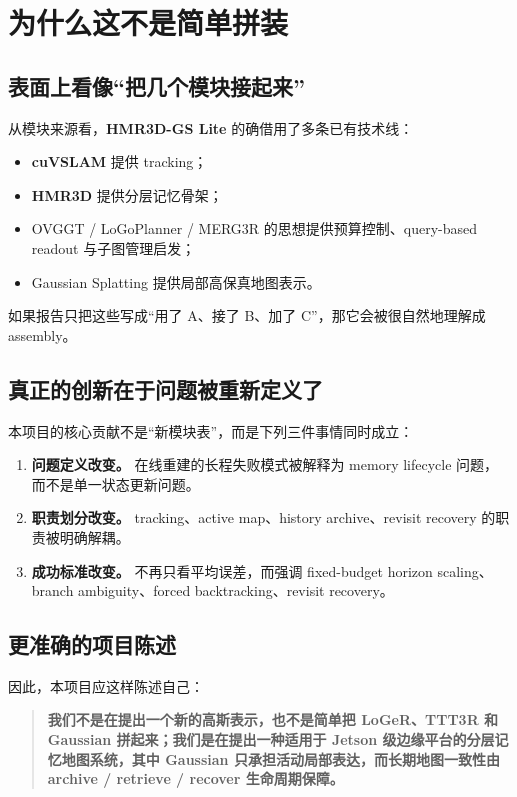 \documentclass[12pt]{article}
\newcommand{\system}{\textbf{HMR3D-GS Lite}}
\newcommand{\hmr}{\textbf{HMR3D}}
\newcommand{\cuvslam}{\textbf{cuVSLAM}}
\begin{document}
\section{为什么这不是简单拼装}

\subsection{表面上看像“把几个模块接起来”}

从模块来源看，\system{} 的确借用了多条已有技术线：
\begin{itemize}
  \item \cuvslam{} 提供 tracking；
  \item \hmr{} 提供分层记忆骨架；
  \item OVGGT / LoGoPlanner / MERG3R 的思想提供预算控制、query-based readout 与子图管理启发；
  \item Gaussian Splatting 提供局部高保真地图表示。
\end{itemize}

如果报告只把这些写成“用了 A、接了 B、加了 C”，那它会被很自然地理解成 assembly。

\subsection{真正的创新在于问题被重新定义了}

本项目的核心贡献不是“新模块表”，而是下列三件事情同时成立：
\begin{enumerate}
  \item \textbf{问题定义改变。} 在线重建的长程失败模式被解释为 memory lifecycle 问题，而不是单一状态更新问题。
  \item \textbf{职责划分改变。} tracking、active map、history archive、revisit recovery 的职责被明确解耦。
  \item \textbf{成功标准改变。} 不再只看平均误差，而强调 fixed-budget horizon scaling、branch ambiguity、forced backtracking、revisit recovery。
\end{enumerate}

\subsection{更准确的项目陈述}

因此，本项目应这样陈述自己：
\begin{quote}
\textbf{我们不是在提出一个新的高斯表示，也不是简单把 LoGeR、TTT3R 和 Gaussian 拼起来；我们是在提出一种适用于 Jetson 级边缘平台的分层记忆地图系统，其中 Gaussian 只承担活动局部表达，而长期地图一致性由 archive / retrieve / recover 生命周期保障。}
\end{quote}
\end{document}
